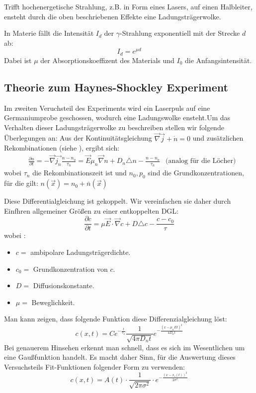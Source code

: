 \documentclass[12pt]{article}
\newcommand{\nab}{\vec{\nabla}} %
\begin{document}
Trifft hochenergetische Strahlung, z.B. in Form eines Lasers, auf einen Halbleiter, ensteht durch die oben beschriebenen Effekte eine Ladungsträgerwolke.

In Materie fällt die Intensität $I_d$ der $\gamma$-Strahlung exponentiell mit der Strecke $d$ ab:
\[I_d=e^{\mu d}\]
Dabei ist $\mu$ der Absorptionskoeffizent des Materials und $I_0$ die Anfangsintensität.

\subsection{Theorie zum Haynes-Shockley Experiment}
\label{teil3theorie}
Im zweiten Veruchsteil des Experiments wird ein Laserpuls auf eine Germaniumprobe geschossen, wodurch eine Ladungswolke ensteht.Um das Verhalten dieser Ladungsträgerwolke zu beschreiben stellen wir folgende Überlegungen an: Aus der Kontinuitätsgleichung $\vec{\nabla}\vec{j}+\dot{n}=0$ und zusätzlichen Rekombinationen (siehe \cite{staat}), ergibt sich:
\begin{align*}
&\frac{\partial n}{\partial t}=-\vec{\nabla}\vec{j_n}\frac{n-n_o}{\tau_n}=\vec{E}\mu_n\vec{\nabla}n+D_n\triangle n-\frac{n-n_o}{\tau_n}&\mbox{(analog für die Löcher)}
\end{align*}
wobei  $\tau_n$ die  Rekombinationszeit ist und $n_0,p_0$ sind die Grundkonzentrationen, für die gilt: $n(\vec{x})=n_0+\bar{n}(\vec{x})$

Diese Differentialgleichung ist gekoppelt. Wir vereinfachen sie daher durch Einfhren allgemeiner Größen zu einer entkoppelten DGL:
\[\frac{\partial c}{\partial t}=\mu\vec{E}\cdot\nab c+D\triangle c-\frac{c-c_0}{\tau}\]
wobei :
\begin{itemize}
	\item $c=$  ambipolare Ladungsträgerdichte.
	\item $c_0=$  Grundkonzentration von $c$.
	\item $D=$  Diffusionskonstante.
	\item $\mu=$ Beweglichkeit.
\end{itemize}
Man kann zeigen, dass folgende Funktion diese Differenzialgleichung löst:
\[c(x,t)=Ce^{-\frac{t}{\tau_n}}\frac{1}{\sqrt{4\pi D_n t}}e^{-\frac{(x-\mu_n E t)^2}{4D_n t}}\]
Bei genauerem Hinsehen erkennt man schnell, dass es sich im Wesentlichen um eine Gaußfunktion handelt. Es macht daher Sinn, für die Auswertung dieses Versuchsteils Fit-Funktionen folgender Form zu verwenden:
\[c(x,t)=A(t)\cdot\frac{1}{\sqrt{2\pi\sigma^2}}\cdot e^{-\frac{(x-x_c(t))^2}{2\sigma^2}}\]
\end{document}
